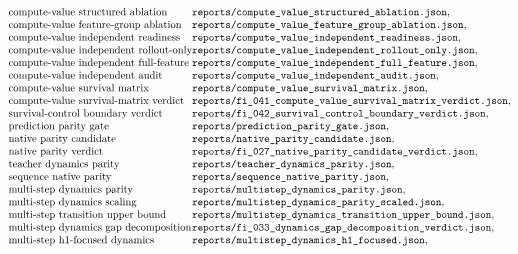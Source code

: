 $$\begin{array}{@{}l@{}l@{}}
\text{compute-value structured ablation} & \texttt{reports/compute\_value\_structured\_ablation.json},\\
\text{compute-value feature-group ablation} & \texttt{reports/compute\_value\_feature\_group\_ablation.json},\\
\text{compute-value independent readiness} & \texttt{reports/compute\_value\_independent\_readiness.json},\\
\text{compute-value independent rollout-only} & \texttt{reports/compute\_value\_independent\_rollout\_only.json},\\
\text{compute-value independent full-feature} & \texttt{reports/compute\_value\_independent\_full\_feature.json},\\
\text{compute-value independent audit} & \texttt{reports/compute\_value\_independent\_audit.json},\\
\text{compute-value survival matrix} & \texttt{reports/compute\_value\_survival\_matrix.json},\\
\text{compute-value survival-matrix verdict} & \texttt{reports/fi\_041\_compute\_value\_survival\_matrix\_verdict.json},\\
\text{survival-control boundary verdict} & \texttt{reports/fi\_042\_survival\_control\_boundary\_verdict.json},\\
\text{prediction parity gate} & \texttt{reports/prediction\_parity\_gate.json},\\
\text{native parity candidate} & \texttt{reports/native\_parity\_candidate.json},\\
\text{native parity verdict} & \texttt{reports/fi\_027\_native\_parity\_candidate\_verdict.json},\\
\text{teacher dynamics parity} & \texttt{reports/teacher\_dynamics\_parity.json},\\
\text{sequence native parity} & \texttt{reports/sequence\_native\_parity.json},\\
\text{multi-step dynamics parity} & \texttt{reports/multistep\_dynamics\_parity.json},\\
\text{multi-step dynamics scaling} & \texttt{reports/multistep\_dynamics\_parity\_scaled.json},\\
\text{multi-step transition upper bound} & \texttt{reports/multistep\_dynamics\_transition\_upper\_bound.json},\\
\text{multi-step dynamics gap decomposition} & \texttt{reports/fi\_033\_dynamics\_gap\_decomposition\_verdict.json},\\
\text{multi-step h1-focused dynamics} & \texttt{reports/multistep\_dynamics\_h1\_focused.json},\\

\end{array}$$

